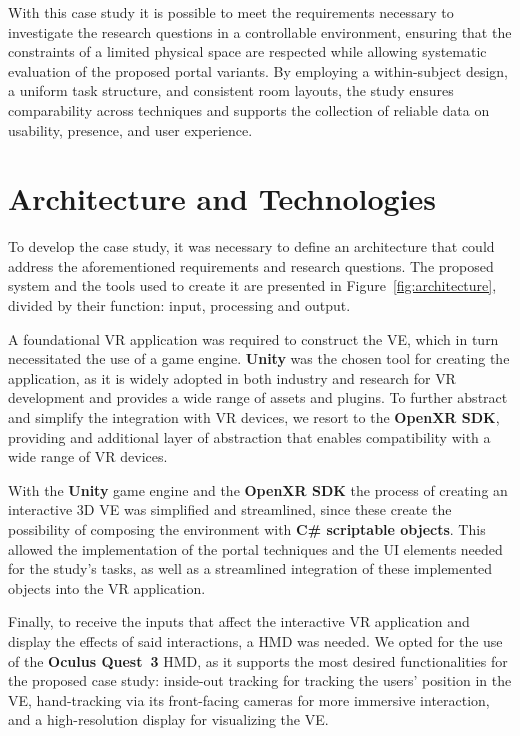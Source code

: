 With this case study it is possible to meet the requirements necessary to investigate the research questions in a controllable environment, 
ensuring that the constraints of a limited physical space are respected while allowing systematic evaluation of the proposed portal variants. 
By employing a within-subject design, a uniform task structure, and consistent room layouts, the study ensures comparability across techniques 
and supports the collection of reliable data on usability, presence, and user experience.

\section{Architecture and Technologies}
\label{sec:architecture-and-technologies}

To develop the case study, it was necessary to define an architecture that could address the aforementioned requirements and research questions.
The proposed system and the tools used to create it are presented in Figure~\ref{fig:architecture}, divided by their function: input, processing 
and output.

A foundational \gls{VR} application was required to construct the \gls{VE}, which in turn necessitated the use of a game engine. \textbf{Unity} 
was the chosen tool for creating the application, as it is widely adopted in both industry and research for \gls{VR} development and provides 
a wide range of assets and plugins. To further abstract and simplify the integration with \gls{VR} devices, we resort to the \textbf{OpenXR SDK}, 
providing and additional layer of abstraction that enables compatibility with a wide range of \gls{VR} devices.

With the \textbf{Unity} game engine and the \textbf{OpenXR SDK} the process of creating an interactive 3D \gls{VE} was simplified and streamlined, 
since these create the possibility of composing the environment with \textbf{C\# scriptable objects}. This allowed the implementation of the portal 
techniques and the UI elements needed for the study's tasks, as well as a streamlined integration of these implemented objects into the \gls{VR} 
application.

Finally, to receive the inputs that affect the interactive \gls{VR} application and display the effects of said interactions, a \gls{HMD} was 
needed. We opted for the use of the \textbf{Oculus Quest~3} \gls{HMD}, as it supports the most desired functionalities for the proposed 
case study: inside-out tracking for tracking the users' position in the \gls{VE}, hand-tracking via its front-facing cameras for more 
immersive interaction, and a high-resolution display for visualizing the \gls{VE}.

